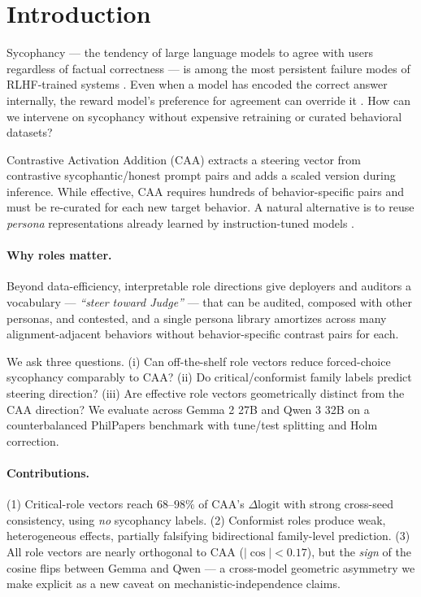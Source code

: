 \documentclass{article}
\theoremstyle{plain}
\theoremstyle{definition}
\theoremstyle{remark}
\begin{document}
\section{Introduction}

Sycophancy --- the tendency of large language models to agree with users regardless of factual correctness --- is among the most persistent failure modes of RLHF-trained systems \cite{perez2022,sharma2023}. Even when a model has encoded the correct answer internally, the reward model's preference for agreement can override it \cite{wang2025a}. How can we intervene on sycophancy without expensive retraining or curated behavioral datasets?

Contrastive Activation Addition (CAA) \cite{rimsky2024,turner2023} extracts a steering vector from contrastive sycophantic/honest prompt pairs and adds a scaled version during inference. While effective, CAA requires hundreds of behavior-specific pairs and must be re-curated for each new target behavior. A natural alternative is to reuse \emph{persona} representations already learned by instruction-tuned models \cite{lu2026}.

\paragraph{Why roles matter.} Beyond data-efficiency, interpretable role directions give deployers and auditors a vocabulary --- \emph{``steer toward Judge''} --- that can be audited, composed with other personas, and contested, and a single persona library amortizes across many alignment-adjacent behaviors without behavior-specific contrast pairs for each.

We ask three questions. (i) Can off-the-shelf role vectors reduce forced-choice sycophancy comparably to CAA? (ii) Do critical/conformist family labels predict steering direction? (iii) Are effective role vectors geometrically distinct from the CAA direction? We evaluate across Gemma 2 27B \cite{gemma2024} and Qwen 3 32B \cite{qwen2025} on a counterbalanced PhilPapers benchmark with tune/test splitting and Holm correction.

\paragraph{Contributions.} (1) Critical-role vectors reach $68$--$98\%$ of CAA's $\Delta\mathrm{logit}$ with strong cross-seed consistency, using \emph{no} sycophancy labels. (2) Conformist roles produce weak, heterogeneous effects, partially falsifying bidirectional family-level prediction. (3) All role vectors are nearly orthogonal to CAA ($|\cos|<0.17$), but the \emph{sign} of the cosine flips between Gemma and Qwen --- a cross-model geometric asymmetry we make explicit as a new caveat on mechanistic-independence claims.
\end{document}
